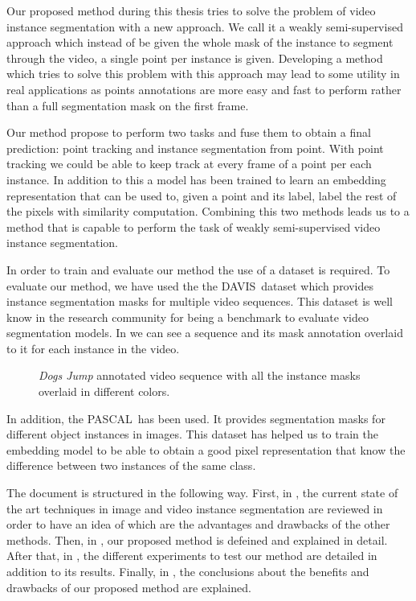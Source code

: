 Our proposed method during this thesis tries to solve the problem of video instance segmentation with a new approach.
We call it a weakly semi-supervised approach which instead of be given the whole mask of the instance to segment through the video, a single point per instance is given.
Developing a method which tries to solve this problem with this approach may lead to some utility in real applications as points annotations are more easy and fast to perform rather than a full segmentation mask on the first frame.

Our method propose to perform two tasks and fuse them to obtain a final prediction: point tracking and instance segmentation from point.
With point tracking we could be able to keep track at every frame of a point per each instance.
In addition to this a model has been trained to learn an embedding representation that can be used to, given a point and its label, label the rest of the pixels with similarity computation.
Combining this two methods leads us to a method that is capable to perform the task of weakly semi-supervised video instance segmentation.

In order to train and evaluate our method the use of a dataset is required.
To evaluate our method, we have used the the DAVIS~\davisboth dataset which provides instance segmentation masks for multiple video sequences.
This dataset is well know in the research community for being a benchmark to evaluate video segmentation models.
In  we can see a sequence and its mask annotation overlaid to it for each instance in the video.

\begin{figure}[h]
  \centering
  \caption{\textit{Dogs Jump} annotated video sequence with all the instance masks overlaid in different colors. }
  \label{fig:intro:davis}
\end{figure}

In addition, the PASCAL~\citepascal has been used. It provides segmentation masks for different object instances in images. This dataset has helped us to train the embedding model to be able to obtain a good pixel representation that know the difference between two instances of the same class.

The document is structured in the following way. First, in , the current state of the art techniques in image and video instance segmentation are reviewed in order to have an idea of which are the advantages and drawbacks of the other methods.
Then, in , our proposed method is defeined and explained in detail.
After that, in , the different experiments to test our method are detailed in addition to its results.
Finally, in , the conclusions about the benefits and drawbacks of our proposed method are explained.





